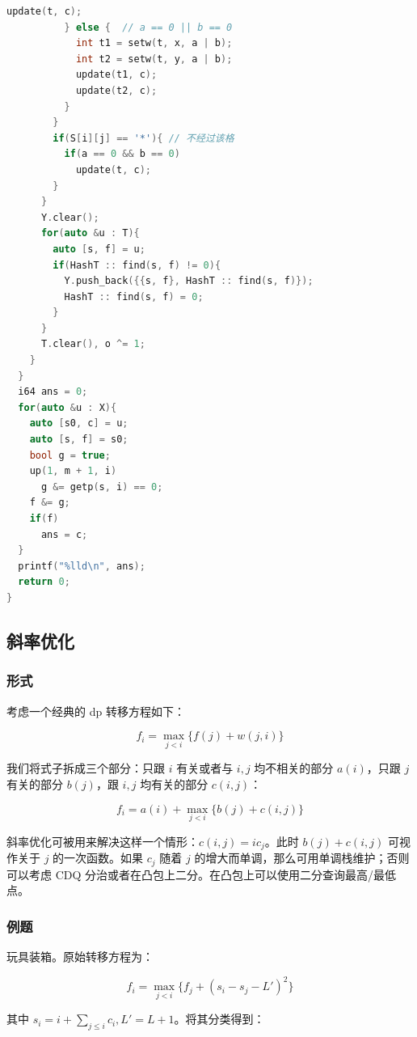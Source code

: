 \documentclass[10pt]{ctexart}
\begin{document}
\begin{multicols}{3}
\begin{lstlisting}[language={C++}]
            update(t, c);
          } else {  // a == 0 || b == 0
            int t1 = setw(t, x, a | b);
            int t2 = setw(t, y, a | b);
            update(t1, c);
            update(t2, c);
          }
        }
        if(S[i][j] == '*'){ // 不经过该格
          if(a == 0 && b == 0)
            update(t, c);
        }
      }
      Y.clear();
      for(auto &u : T){
        auto [s, f] = u;
        if(HashT :: find(s, f) != 0){
          Y.push_back({{s, f}, HashT :: find(s, f)});
          HashT :: find(s, f) = 0;
        }
      }
      T.clear(), o ^= 1;
    }
  }
  i64 ans = 0;
  for(auto &u : X){
    auto [s0, c] = u;
    auto [s, f] = s0;
    bool g = true;
    up(1, m + 1, i)
      g &= getp(s, i) == 0;
    f &= g;
    if(f)
      ans = c;
  }
  printf("%lld\n", ans);
  return 0;
}
\end{lstlisting}

    \subsection{斜率优化}\label{ux659cux7387ux4f18ux5316}

    \subsubsection{形式}\label{ux5f62ux5f0f}

    考虑一个经典的 dp 转移方程如下：

    \[f_i = \max_{j < i}\{f(j) + w(j, i)\}\]

    我们将式子拆成三个部分：只跟 \(i\) 有关或者与 \(i,j\) 均不相关的部分
    \(a(i)\)，只跟 \(j\) 有关的部分 \(b(j)\)，跟 \(i,j\) 均有关的部分
    \(c(i,j)\)：

    \[f_{i} = a(i) + \max_{j<i} \{b(j)+c(i,j)\}\]

    斜率优化可被用来解决这样一个情形：\(c(i,j)=ic_j\)。此时
    \(b(j)+c(i,j)\) 可视作关于 \(j\) 的一次函数。如果 \(c_j\) 随着 \(j\)
    的增大而单调，那么可用单调栈维护；否则可以考虑 CDQ
    分治或者在凸包上二分。在凸包上可以使用二分查询最高/最低点。

    \subsubsection{例题}\label{ux4f8bux9898-2}

    玩具装箱。原始转移方程为：

    \[f_i = \max_{j< i}\{f_j + (s_i-s_j-L')^2\}\]

    其中 \(s_i = i+\sum_{j\le i}c_i, L'=L+1\)。将其分类得到：


\end{multicols}
\end{document}

